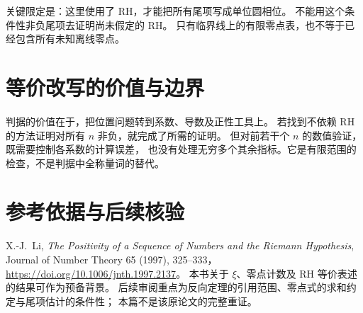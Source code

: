 \documentclass[UTF8,fontset=fandol,11pt]{ctexart}
\begin{document}
关键限定是：这里使用了 RH，才能把所有尾项写成单位圆相位。
不能用这个条件性非负尾项去证明尚未假定的 RH。
只有临界线上的有限零点表，也不等于已经包含所有未知离线零点。

\section{等价改写的价值与边界}
判据的价值在于，把位置问题转到系数、导数及正性工具上。
若找到不依赖 RH 的方法证明对所有 $n$ 非负，就完成了所需的证明。
但对前若干个 $n$ 的数值验证，既需要控制各系数的计算误差，
也没有处理无穷多个其余指标。它是有限范围的检查，不是判据中全称量词的替代。

\section*{参考依据与后续核验}
X.-J.\ Li, \emph{The Positivity of a Sequence of Numbers and the Riemann Hypothesis},
Journal of Number Theory 65 (1997), 325--333，
\url{https://doi.org/10.1006/jnth.1997.2137}。
本书关于 $\xi$、零点计数及 RH 等价表述的结果可作为预备背景。
后续审阅重点为反向定理的引用范围、零点式的求和约定与尾项估计的条件性；
本篇不是该原论文的完整重证。
\end{document}
